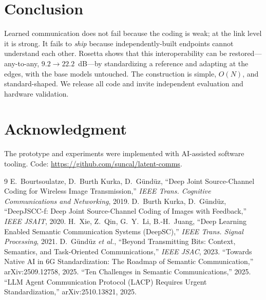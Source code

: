 \documentclass[11pt]{article}
\begin{document}
\section{Conclusion}
Learned communication does not fail because the coding is weak; at the link level it is
strong. It fails to \emph{ship} because independently-built endpoints cannot understand
each other. Rosetta shows that this interoperability can be restored---any-to-any,
$9.2\rightarrow22.2$~dB---by standardizing a reference and adapting at the edges, with
the base models untouched. The construction is simple, $O(N)$, and standard-shaped. We
release all code and invite independent evaluation and hardware validation.

\section*{Acknowledgment}
The prototype and experiments were implemented with AI-assisted software tooling.
Code: \url{https://github.com/suncal/latent-comms}.

\begin{thebibliography}{9}
\small
{} E.~Bourtsoulatze, D.~Burth Kurka, D.~G\"und\"uz,
``Deep Joint Source-Channel Coding for Wireless Image Transmission,''
\emph{IEEE Trans. Cognitive Communications and Networking}, 2019.
 D.~Burth Kurka, D.~G\"und\"uz, ``DeepJSCC-f: Deep Joint
Source-Channel Coding of Images with Feedback,'' \emph{IEEE JSAIT}, 2020.
 H.~Xie, Z.~Qin, G.~Y.~Li, B.-H.~Juang, ``Deep Learning Enabled
Semantic Communication Systems (DeepSC),'' \emph{IEEE Trans. Signal Processing}, 2021.
 D.~G\"und\"uz \emph{et al.}, ``Beyond Transmitting Bits: Context,
Semantics, and Task-Oriented Communications,'' \emph{IEEE JSAC}, 2023.
 ``Towards Native AI in 6G Standardization: The Roadmap of
Semantic Communication,'' arXiv:2509.12758, 2025.
 ``Ten Challenges in Semantic Communications,'' 2025.
 ``LLM Agent Communication Protocol (LACP) Requires Urgent
Standardization,'' arXiv:2510.13821, 2025.
\end{thebibliography}
\end{document}
